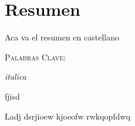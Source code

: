 \thispagestyle{empty}
\chapter*{Resumen}

Aca va el resumen en castellano

\bigskip

\noindent \textsc{Palabras Clave:} \textsf{}

\textit{italica}

\textsf{fjisd}

Ladj dsrjioew kjoeofw
rwkqopfdwq
